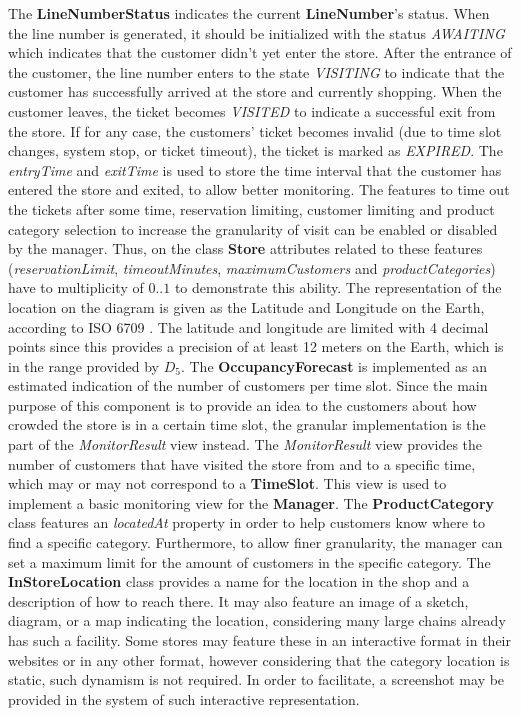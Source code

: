 The \textbf{LineNumberStatus} indicates the current \textbf{LineNumber}'s status.
When the line number is generated, it should be initialized with the status \textit{AWAITING} which indicates that the customer didn't yet enter the store.
After the entrance of the customer, the line number enters to the state \textit{VISITING} to indicate that the customer has successfully arrived at the store and currently shopping.
When the customer leaves, the ticket becomes \textit{VISITED} to indicate a successful exit from the store.
If for any case, the customers' ticket becomes invalid (due to time slot changes, system stop, or ticket timeout), the ticket is marked as \textit{EXPIRED}.
The \textit{entryTime} and \textit{exitTime} is used to store the time interval that the customer has entered the store and exited, to allow better monitoring.
The features to time out the tickets after some time, reservation limiting, customer limiting and product category selection to increase the granularity of visit can be enabled or disabled by the manager.
Thus, on the class \textbf{Store} attributes related to these features (\textit{reservationLimit}, \textit{timeoutMinutes}, \textit{maximumCustomers} and \textit{productCategories}) have to multiplicity of $0..1$ to demonstrate this ability.
The representation of the location on the diagram is given as the Latitude and Longitude on the Earth, according to ISO 6709 \cite{isogeo}.
The latitude and longitude are limited with 4 decimal points since this provides a precision of at least 12 meters on the Earth, which is in the range provided by $D_{5}$.
The \textbf{OccupancyForecast} is implemented as an estimated indication of the number of customers per time slot.
Since the main purpose of this component is to provide an idea to the customers about how crowded the store is in a certain time slot, the granular implementation is the part of the \textit{MonitorResult} view instead.
The \textit{MonitorResult} view provides the number of customers that have visited the store from and to a specific time, which may or may not correspond to a \textbf{TimeSlot}.
This view is used to implement a basic monitoring view for the \textbf{Manager}.
The \textbf{ProductCategory} class features an \textit{locatedAt} property in order to help customers know where to find a specific category.
Furthermore, to allow finer granularity, the manager can set a maximum limit for the amount of customers in the specific category.
The \textbf{InStoreLocation} class provides a name for the location in the shop and a description of how to reach there.
It may also feature an image of a sketch, diagram, or a map indicating the location, considering many large chains already has such a facility.
Some stores may feature these in an interactive format in their websites or in any other format, however considering that the category location is static, such dynamism is not required.
In order to facilitate, a screenshot may be provided in the system of such interactive representation.

